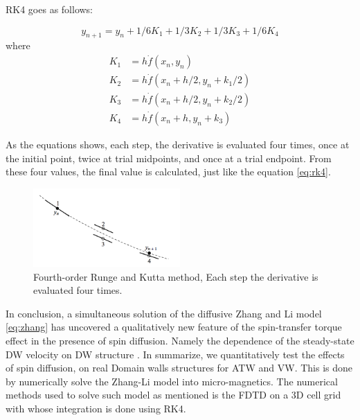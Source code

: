 RK4 goes as follows:

\begin{equation} \label{eq:rk4}
y_{n+1} = y_{n} + 1/6 K_{1} + 1/3 K_{2} +1/3 K_{3} + 1/6 K_{4}
\end{equation}
where
\begin{equation}
\begin{split} \label{eq:rksplit}
K_{1} &= h \dot f(x_{n}, y_{n}) \\
K_{2} &= h \dot f(x_{n} + h/2, y_{n} + k_{1}/2) \\
K_{3} &= h \dot f(x_{n} + h/2, y_{n} + k_{2}/2) \\
K_{4} &= h \dot f(x_{n} + h, y_{n} + k_{3})
\end{split}
\end{equation}

As the equations shows, each step, the derivative is evaluated four times, once at the initial point, twice at trial midpoints, and once at a trial endpoint. From these four values, the final value is calculated, just like the equation \ref{eq:rk4}.

\begin{figure}[htbp]
	\centering
		\includegraphics[width=0.5\textwidth]{Figures/rk4.png}
		\smallskip
	\caption[Fourth-order Runge and Kutta Method]{Fourth-order Runge and Kutta method, Each step the derivative is evaluated four times. }
	\label{fig:kutta}
\end{figure}


\vspace{3.5em}

In conclusion, a simultaneous solution of the diffusive Zhang and Li model \ref{eq:zhang} has uncovered a qualitatively new feature of the spin-transfer torque effect in the presence of spin diffusion. Namely the dependence of the steady-state DW velocity on DW structure \cite{claudio}. In summarize, we quantitatively test the effects of spin diffusion, on real Domain walls structures for ATW and VW. This is done by numerically solve the Zhang-Li model into micro-magnetics. The numerical methods used to solve such model as mentioned is the FDTD on a 3D cell grid with whose integration is done using RK4.






